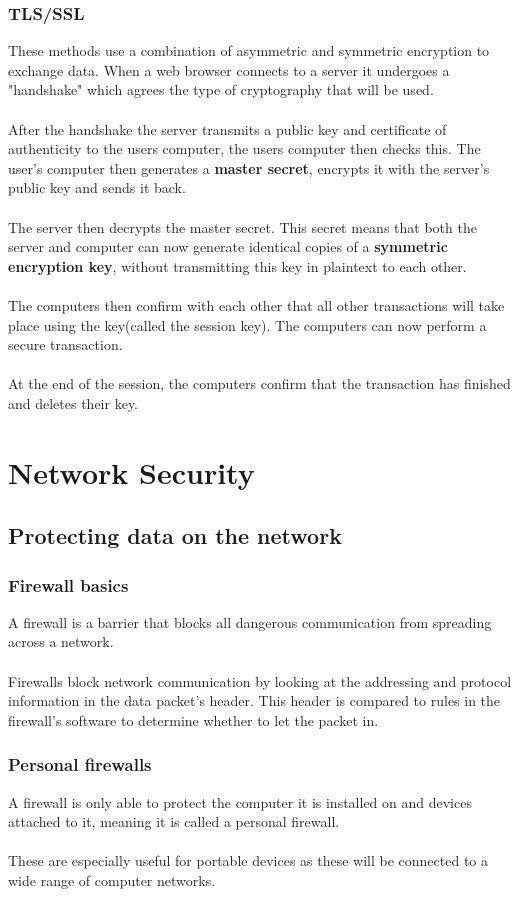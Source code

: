 \documentclass{article}[18pt]
\begin{document}
\subsubsection{TLS/SSL}
These methods use a combination of asymmetric and symmetric encryption to exchange data. When a web browser connects to a server it undergoes a "handshake" which agrees the type of cryptography that will be used.\\
\\
After the handshake the server transmits a public key and certificate of authenticity to the users computer, the users computer then checks this. The user's computer then generates a \textbf{master secret}, encrypts it with the server's public key and sends it back.\\
\\
The server then decrypts the master secret. This secret means that both the server and computer can now generate identical copies of a \textbf{symmetric encryption key}, without transmitting this key in plaintext to each other.\\
\\
The computers then confirm with each other that all other transactions will take place using the key(called the session key). The computers can now perform a secure transaction.\\
\\
At the end of the session, the computers confirm that the transaction has finished and deletes their key.
\section{Network Security}
\subsection{Protecting data on the network}
\subsubsection{Firewall basics}
A firewall is a barrier that blocks all dangerous communication from spreading across a network.\\
\\
Firewalls block network communication by looking at the addressing and protocol information in the data packet's header. This header is compared to rules in the firewall's software to determine whether to let the packet in.\\
\subsubsection{Personal firewalls}
A firewall is only able to protect the computer it is installed on and devices attached to it, meaning it is called a personal firewall.\\
\\
These are especially useful for portable devices as these will be connected to a wide range of computer networks.
\end{document}
